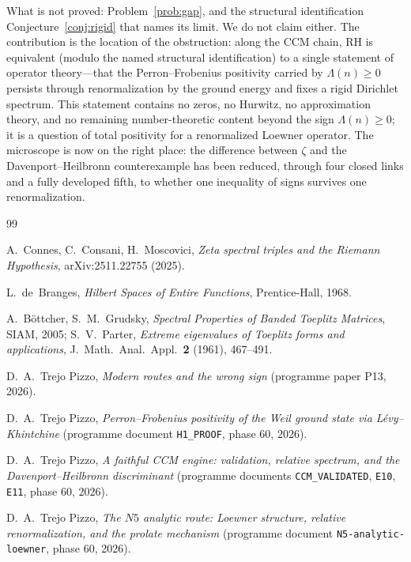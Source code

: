 \documentclass[11pt]{amsart}
\theoremstyle{definition}
\theoremstyle{remark}
\newcommand{\RH}{\mathrm{RH}}
\newcommand{\Lam}{\Lambda}
\begin{document}
What is not proved: Problem~\ref{prob:gap}, and the structural identification
Conjecture~\ref{conj:rigid} that names its limit. We do not claim either. The
contribution is the location of the obstruction: along the CCM chain, $\RH$ is
equivalent (modulo the named structural identification) to a single statement
of operator theory---that the Perron--Frobenius positivity carried by
$\Lam(n)\geq0$ persists through renormalization by the ground energy and fixes
a rigid Dirichlet spectrum. This statement contains no zeros, no Hurwitz, no
approximation theory, and no remaining number-theoretic content beyond the
sign $\Lam(n)\geq0$; it is a question of total positivity for a renormalized
Loewner operator. The microscope is now on the right place: the difference
between $\zeta$ and the Davenport--Heilbronn counterexample has been reduced,
through four closed links and a fully developed fifth, to whether one
inequality of signs survives one renormalization.

\begin{thebibliography}{99}

 A.~Connes, C.~Consani, H.~Moscovici, \emph{Zeta spectral
triples and the Riemann Hypothesis}, arXiv:2511.22755 (2025).

 L.~de~Branges, \emph{Hilbert Spaces of Entire Functions},
Prentice-Hall, 1968.

 A.~B\"ottcher, S.~M.~Grudsky, \emph{Spectral Properties of
Banded Toeplitz Matrices}, SIAM, 2005; S.~V.~Parter, \emph{Extreme
eigenvalues of Toeplitz forms and applications}, J.\ Math.\ Anal.\ Appl.\
\textbf{2} (1961), 467--491.

 D.~A.~Trejo Pizzo, \emph{Modern routes and the wrong sign}
(programme paper P13, 2026).

 D.~A.~Trejo Pizzo, \emph{Perron--Frobenius positivity of the
Weil ground state via L\'evy--Khintchine} (programme document
\texttt{H1\_PROOF}, phase 60, 2026).

 D.~A.~Trejo Pizzo, \emph{A faithful CCM engine: validation,
relative spectrum, and the Davenport--Heilbronn discriminant} (programme
documents \texttt{CCM\_VALIDATED}, \texttt{E10}, \texttt{E11}, phase 60,
2026).

 D.~A.~Trejo Pizzo, \emph{The $N5$ analytic route: Loewner
structure, relative renormalization, and the prolate mechanism} (programme
document \texttt{N5-analytic-loewner}, phase 60, 2026).

\end{thebibliography}
\end{document}
